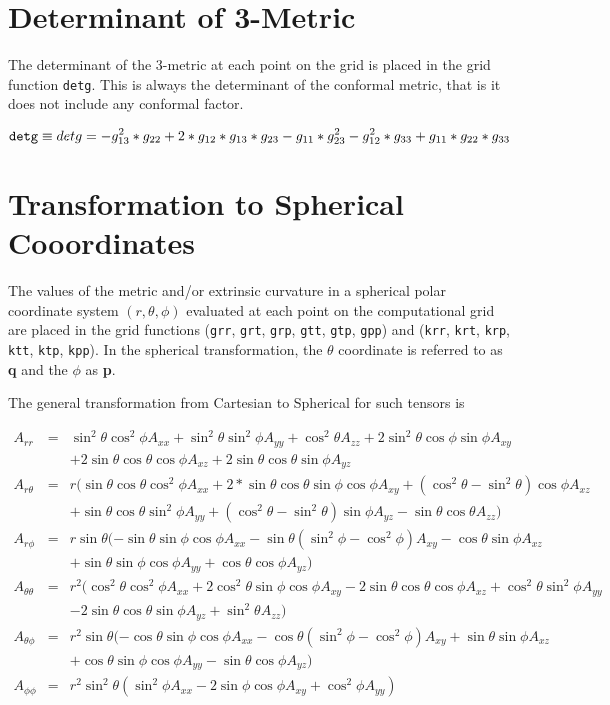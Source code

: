 \documentclass{article}
\begin{document}
\section{Determinant of 3-Metric}

The determinant of the 3-metric at each point on the grid is placed in
the grid function {\tt detg}. This is always the determinant of the 
conformal metric, that is it does not include any conformal factor.

\begin{equation}
{\tt detg} \equiv det g =
-g_{13}^2*g_{22}+2*g_{12}*g_{13}*g_{23}-g_{11}*g_{23}^2-
g_{12}^2*g_{33}+g_{11}*g_{22}*g_{33}
\end{equation}


\section{Transformation to Spherical Cooordinates}

The values of the metric and/or extrinsic curvature in a spherical
polar coordinate system $(r,\theta,\phi)$ evaluated at each point on
the computational grid are placed in the grid functions ({\tt grr},
{\tt grt}, {\tt grp}, {\tt gtt}, {\tt gtp}, {\tt gpp}) and ({\tt krr},
{\tt krt}, {\tt krp}, {\tt ktt}, {\tt ktp}, {\tt kpp}).
In the spherical transformation, the $\theta$ coordinate is referred to
as {\bf q} and the $\phi$ as {\bf p}.

The general transformation from Cartesian to Spherical for such tensors 
is

\begin{eqnarray*}
A_{rr}&=&
\sin^2\theta\cos^2\phi A_{xx}
+\sin^2\theta\sin^2\phi A_{yy}
+\cos^2\theta A_{zz}
+2\sin^2\theta\cos\phi\sin\phi A_{xy}
\\
&&
+2\sin\theta\cos\theta\cos\phi A_{xz}
+2\sin\theta\cos\theta\sin\phi A_{yz}
\\
A_{r\theta}&=&
r(\sin\theta\cos\theta\cos^2\phi A_{xx}
+2*\sin\theta\cos\theta\sin\phi\cos\phi A_{xy}
+(\cos^2\theta-\sin^2\theta)\cos\phi A_{xz}
\\
&&
+\sin\theta\cos\theta\sin^2\phi A_{yy}
+(\cos^2\theta-\sin^2\theta)\sin\phi A_{yz}
-\sin\theta\cos\theta A_{zz})
\\
A_{r\phi}&=&
r\sin\theta(-\sin\theta\sin\phi\cos\phi A_{xx}
-\sin\theta(\sin^2\phi-\cos^2\phi)A_{xy}
-\cos\theta\sin\phi A_{xz}
\\
&&
+\sin\theta\sin\phi\cos\phi A_{yy}
+\cos\theta\cos\phi A_{yz})
\\
A_{\theta\theta}&=&
r^2(\cos^2\theta\cos^2\phi A_{xx}
+2\cos^2\theta\sin\phi\cos\phi A_{xy}
-2\sin\theta\cos\theta\cos\phi A_{xz}
+\cos^2\theta\sin^2\phi A_{yy}
\\
&&
-2\sin\theta\cos\theta\sin\phi A_{yz}
+\sin^2\theta A_{zz})
\\
A_{\theta\phi}&=&
r^2\sin\theta(-\cos\theta\sin\phi\cos\phi A_{xx}
-\cos\theta(\sin^2\phi-\cos^2\phi)A_{xy}
+\sin\theta \sin\phi A_{xz}
\\
&&
+\cos\theta\sin\phi\cos\phi A_{yy}
-\sin\theta\cos\phi A_{yz})
\\
A_{\phi\phi}&=&
r^2\sin^2\theta(\sin^2\phi A_{xx}
-2\sin\phi\cos\phi A_{xy}
+\cos^2\phi A_{yy})
\end{eqnarray*}
\end{document}
